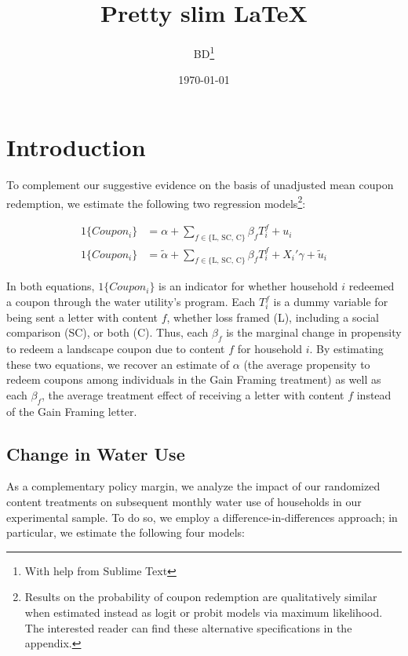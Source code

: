\documentclass[12pt]{article}%
\begin{document}
\title{\textbf{Pretty slim \LaTeX}}
\author{BD\thanks{With help from Sublime Text}}
\date{\today}

\maketitle

\newpage

\section{Introduction}

To complement our suggestive evidence on the basis of unadjusted mean coupon redemption, we estimate the following two regression models\footnote{Results on the probability of coupon redemption are qualitatively similar when estimated instead as logit or probit models via maximum likelihood. The interested reader can find these alternative specifications in the appendix.}:

\begin{align}
1\{Coupon_{i}\} &= \alpha + \displaystyle\sum_{f \in \{\text{L, SC, C}\}} \beta_f T^f_i + u_i \label{eq:uptake_nocovars}  \\
1\{Coupon_{i}\} &= \tilde{\alpha} + \displaystyle\sum_{f \in \{\text{L, SC, C}\}} \beta_f T^f_i + X_i'\gamma + \tilde{u}_i \label{eq:uptake_covars}
\end{align}

In both equations, $1\{Coupon_{i}\}$ is an indicator for whether household $i$ redeemed a coupon through the water utility's program. Each $T_i^f$ is a dummy variable for being sent a letter with content $f$, whether loss framed (L), including a social comparison (SC), or both (C). Thus, each $\beta_f$ is the marginal change in propensity to redeem a landscape coupon due to content $f$ for household $i$. By estimating these two equations, we recover an estimate of $\alpha$ (the average propensity to redeem coupons among individuals in the Gain Framing treatment) as well as each $\beta_f$, the average treatment effect of receiving a letter with content $f$ instead of the Gain Framing letter.

\subsection{Change in Water Use}

As a complementary policy margin, we analyze the impact of our randomized content treatments on subsequent monthly water use of households in our experimental sample. To do so, we employ a difference-in-differences approach; in particular, we estimate the following four models:
\end{document}
